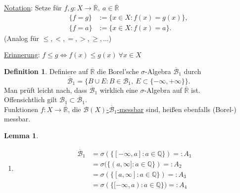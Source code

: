 \documentclass[a4paper]{scrreprt}
\newcommand{\R}{\mathbb{R}}
\newcommand{\Rq}{\overline{\R}}
\newcommand{\Q}{\mathbb{Q}}
\newcommand{\Borel}{\mathcal{B}}
\newcommand{\Borelq}{\overline{\Borel}}
\newcommand{\jlabel}[1]{\label{j_#1}}
\newcommand{\jhyperref}[2]{\hyperref[j_#1]{#2}}
\newcommand{\mb}[2]{\jhyperref{messbar}{#1-#2-messbar}}
\newcommand{\jabb}[3]{ #1: #2 \rightarrow #3 }
\theoremstyle{plain}
\newtheorem{lem}[thm]{Lemma}
\theoremstyle{definition}
\newtheorem*{defn*}{Definition}
\begin{document}
{{{\uline{Notation}: Setze für $\jabb{f,g}{X}{\Rq}, \ a\in \Rq$ 
\begin{displaymath}
    \begin{split}
        \{f=g\} &:= \{x\in X: f(x) = g(x)\},\\
        \{f=a\} &:= \{x\in X: f(x) = a\}.
    \end{split} 
\end{displaymath}
(Analog für $\le, <, =, >, \ge, \dots$)

\vspace{12pt}

\uline{Erinnerung}: $f\le g \Leftrightarrow f(x) \le g(x) \ \forall x\in X$

\begin{defn*}
    Definiere auf $\Rq$ die Borel'sche $\sigma$-Algebra $\Borelq_1$ durch
    \jlabel{(2.1)}
    \begin{equation}
        \Borelq_1 = \{B\cup E : B\in \Borel_1, \ E\subset \{-\infty, +\infty\}\}.
    \end{equation}
    Man prüft leicht nach, dass $\Borelq_1$ wirklich eine $\sigma$-Algebra auf $\Rq$ ist.\\
    Offensichtlich gilt $\Borel_1 \subset \Borelq_1$.\\
    Funktionen $\jabb{f}{X}{\Rq}$, die \mb{$\Borel(X)$}{$\Borelq_1$} sind, heißen ebenfalls (Borel-) messbar.
\end{defn*}

\jlabel{Lem 2.6}
\begin{lem}
    \begin{enumerate}
        \item 
            \begin{displaymath}
                \begin{split}
                    \Borelq_1 &= \sigma(\{[-\infty, a]: a\in \Q\}) =: A_1\\
                                             &= \sigma(\{(a, \infty]: a\in \Q\}) =: A_2\\
                                             &= \sigma(\{[a, \infty]: a\in \Q\}) =: A_3\\
                                             &= \sigma(\{[-\infty, a): a\in \Q\}) =: A_4
                \end{split}
            \end{displaymath}
            

\end{enumerate}
\end{lem}}}}
\end{document}
